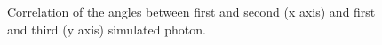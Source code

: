\documentclass[main.tex]{subfiles}
\begin{document}
\begin{figure}[H]
  \centering
  \caption{Correlation of the angles between first and second (x axis) and first and third (y axis) simulated photon.}
  \label{fig:sim:ang:corr}
\end{figure}


\end{document}
